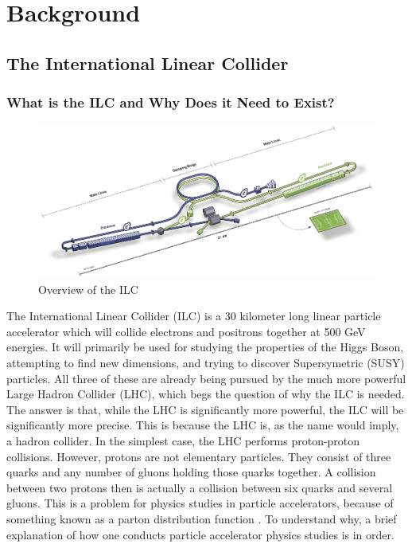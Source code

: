 \documentclass{report}
\begin{document}
    \chapter{ Background }
         \setcounter{page}{1}
        \section{ The International Linear Collider }
            \subsection{ What is the ILC and Why Does it Need to Exist? }
                \begin{figure}[h] 
                    \includegraphics[width=\textwidth]{ilcoverview}
                    \centering
                    \caption{Overview of the ILC}
                    \label{fig:ilcoverview}
                \end{figure}

                The International Linear Collider (ILC) is a 30 kilometer long linear particle accelerator \cite{specs} which will collide electrons and positrons together at 500 GeV energies. It will primarily be used for studying the properties of the Higgs Boson, attempting to find new dimensions, and trying to discover Supersymetric (SUSY) particles. All three of these are already being pursued by the much more powerful Large Hadron Collider (LHC), which begs the question of why the ILC is needed. The answer is that, while the LHC is significantly more powerful, the ILC will be significantly more precise. This is because the LHC is, as the name would imply, a hadron collider. In the simplest case, the LHC performs proton-proton collisions. However, protons are not elementary particles. They consist of three quarks and any number of gluons holding those quarks together. A collision between two protons then is actually a collision between six quarks and several gluons. This is a problem for physics studies in particle accelerators, because of something known as a parton distribution function \cite{parton} . To understand why, a brief explanation of how one conducts particle accelerator physics studies is in order.
\end{document}
